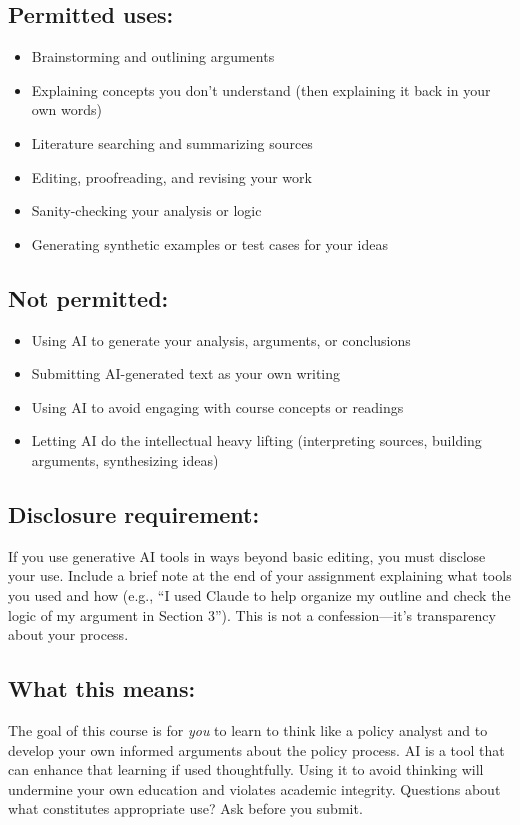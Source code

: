 \documentclass[12pt]{article}
\begin{document}
\subsection*{Permitted uses:}
\begin{itemize}
\item Brainstorming and outlining arguments
\item Explaining concepts you don't understand (then explaining it back in your own words)
\item Literature searching and summarizing sources
\item Editing, proofreading, and revising your work
\item Sanity-checking your analysis or logic
\item Generating synthetic examples or test cases for your ideas
\end{itemize}

\subsection*{Not permitted:}
\begin{itemize}
\item Using AI to generate your analysis, arguments, or conclusions
\item Submitting AI-generated text as your own writing
\item Using AI to avoid engaging with course concepts or readings
\item Letting AI do the intellectual heavy lifting (interpreting sources, building arguments, synthesizing ideas)
\end{itemize}

\subsection*{Disclosure requirement:}
If you use generative AI tools in ways beyond basic editing, you must disclose your use. Include a brief note at the end of your assignment explaining what tools you used and how (e.g., ``I used Claude to help organize my outline and check the logic of my argument in Section 3''). This is not a confession---it's transparency about your process.

\subsection*{What this means:}
The goal of this course is for \emph{you} to learn to think like a policy analyst and to develop your own informed arguments about the policy process. AI is a tool that can enhance that learning if used thoughtfully. Using it to avoid thinking will undermine your own education and violates academic integrity. Questions about what constitutes appropriate use? Ask before you submit.
\end{document}
